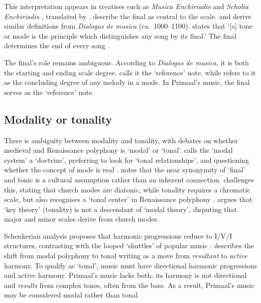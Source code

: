 \documentclass{article}
\begin{document}
This interpretation appears in treatises such as \textit{Musica Enchiriadis} and \textit{Scholia Enchiriadis} \citep{Hucbaldus900musicaenrichidis,Hucbaldus900scholiaenrichidis}, translated by \citet{erickson1995musica}. \citet[p.~50]{erickson1995musica} describe the final as central to the scale. \citet[p.~17]{coeurdevey1998histoire} and \citet{powers2001mode} derive similar definitions from \emph{Dialogus de musica} (ca.~1000--1100). \citeauthor{coeurdevey1998histoire} states that `[a] tone or mode is the principle which distinguishes any song by its final.' The final determines the end of every song \citep{latina1841patrologiae}.

The final's role remains ambiguous. According to \emph{Dialogus de musica}, it is both the starting and ending scale degree. \citet{meeus2023theoretical} calls it the `reference' note, while \citet{powers2001final} refers to it as the concluding degree of any melody in a mode. In Primaal's music, the final serves as the `reference' note.


\subsection{Modality or tonality}\label{sec:modalitytonality}


There is ambiguity between modality and tonality, with debates on whether medieval and Renaissance polyphony is `modal' or `tonal'. \citet{powers1981tonal} calls the `modal system' a `doctrine', preferring to look for `tonal relationships', and questioning whether the concept of mode is real \citep{powers2017mode}. \citet{powers2001final} notes that the near synonymity of `final' and tonic is a cultural assumption rather than an inherent connection. \citet{meeus2013modalite} challenges this, stating that church modes are diatonic, while tonality requires a chromatic scale, but also recognises a `tonal center' in Renaissance polyphony \citep{meeus2023theoretical}. \citet{atcherson1973key} argues that `key theory' (tonality) is not a descendant of `modal theory', disputing that major and minor scales derive from church modes.


Schenkerian analysis \citep{schenker1935satz} proposes that harmonic progressions reduce to I/V/I structures, contrasting with the looped `shuttles' of popular music \citep{tagg2009everyday}. \citet[p.~82]{coeurdevey1998histoire} describes the shift from modal polyphony to tonal writing as a move from \textit{resultant} to \textit{active} harmony. To qualify as `tonal', music must have directional harmonic progressions and active harmony. Primaal's music lacks both: its harmony is not directional and \textit{results} from complex tones, often from the bass. As a result, Primaal's music may be considered modal rather than tonal.
\end{document}
